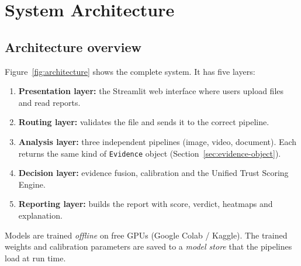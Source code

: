 \documentclass[11pt,a4paper]{article}
\begin{document}
\section{System Architecture}
\label{sec:architecture}

\subsection{Architecture overview}
Figure~\ref{fig:architecture} shows the complete system. It has five layers:
\begin{enumerate}
  \item \textbf{Presentation layer:} the Streamlit web interface where users upload files and read reports.
  \item \textbf{Routing layer:} validates the file and sends it to the correct pipeline.
  \item \textbf{Analysis layer:} three independent pipelines (image, video, document). Each
        returns the same kind of \texttt{Evidence} object (Section~\ref{sec:evidence-object}).
  \item \textbf{Decision layer:} evidence fusion, calibration and the Unified Trust Scoring Engine.
  \item \textbf{Reporting layer:} builds the report with score, verdict, heatmaps and explanation.
\end{enumerate}
Models are trained \emph{offline} on free GPUs (Google Colab / Kaggle). The trained weights and
calibration parameters are saved to a \emph{model store} that the pipelines load at run time.
\end{document}
